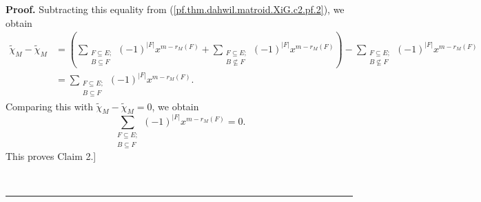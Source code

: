 \documentclass[numbers=enddot,12pt,final,onecolumn,notitlepage]{scrartcl}%
\theoremstyle{definition}
\newenvironment{proof}[1][Proof]{\noindent\textbf{#1.} }{\ \rule{0.5em}{0.5em}}
\newenvironment{verlong}{}{}
\let\sumnonlimits\sum
\renewcommand{\sum}{\sumnonlimits\limits}
\begin{document}
\begin{verlong}
\begin{proof}
Subtracting this equality from (\ref{pf.thm.dahwil.matroid.XiG.c2.pf.2}), we
obtain%
\begin{align*}
\widetilde{\chi}_{M}-\widetilde{\chi}_{M}  &  =\left(  \sum
_{\substack{F\subseteq E;\\B\subseteq F}}\left(  -1\right)  ^{\left\vert
F\right\vert }x^{m-r_{M}\left(  F\right)  }+\sum_{\substack{F\subseteq
E;\\B\not \subseteq F}}\left(  -1\right)  ^{\left\vert F\right\vert
}x^{m-r_{M}\left(  F\right)  }\right)  -\sum_{\substack{F\subseteq
E;\\B\not \subseteq F}}\left(  -1\right)  ^{\left\vert F\right\vert
}x^{m-r_{M}\left(  F\right)  }\\
&  =\sum_{\substack{F\subseteq E;\\B\subseteq F}}\left(  -1\right)
^{\left\vert F\right\vert }x^{m-r_{M}\left(  F\right)  }.
\end{align*}
Comparing this with $\widetilde{\chi}_{M}-\widetilde{\chi}_{M}=0$, we obtain%
\[
\sum_{\substack{F\subseteq E;\\B\subseteq F}}\left(  -1\right)  ^{\left\vert
F\right\vert }x^{m-r_{M}\left(  F\right)  }=0.
\]
This proves Claim 2.]


\end{proof}
\end{verlong}
\end{document}
